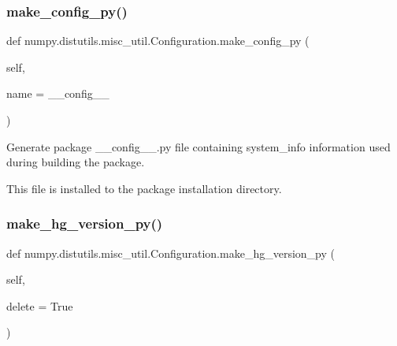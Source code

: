 \subsubsection{\texorpdfstring{make\+\_\+config\+\_\+py()}{make\_config\_py()}}
{\footnotesize\ttfamily def numpy.\+distutils.\+misc\+\_\+util.\+Configuration.\+make\+\_\+config\+\_\+py (\begin{DoxyParamCaption}\item[{}]{self,  }\item[{}]{name = {\ttfamily \textquotesingle{}\+\_\+\+\_\+config\+\_\+\+\_\+\textquotesingle{}} }\end{DoxyParamCaption})}

\begin{DoxyVerb}Generate package __config__.py file containing system_info
information used during building the package.

This file is installed to the
package installation directory.\end{DoxyVerb}
 \mbox{\label{classnumpy_1_1distutils_1_1misc__util_1_1Configuration_a8851f8b6adb79e3ea6b0bdcfd55f8980}} 
\subsubsection{\texorpdfstring{make\+\_\+hg\+\_\+version\+\_\+py()}{make\_hg\_version\_py()}}
{\footnotesize\ttfamily def numpy.\+distutils.\+misc\+\_\+util.\+Configuration.\+make\+\_\+hg\+\_\+version\+\_\+py (\begin{DoxyParamCaption}\item[{}]{self,  }\item[{}]{delete = {\ttfamily True} }\end{DoxyParamCaption})}

